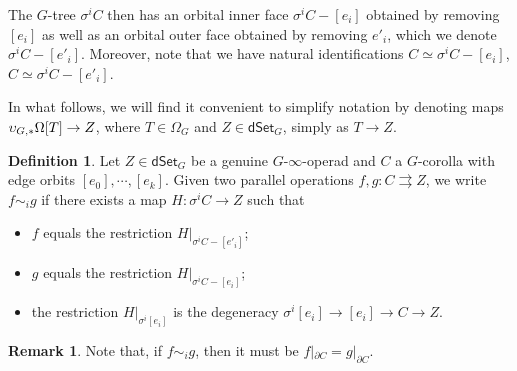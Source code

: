 \documentclass[a4paper,10pt
,draft
]{article}%
\numberwithin{equation}{section}
\numberwithin{figure}{section}
\theoremstyle{definition} %
\newtheorem{definition}[equation]{Definition}%
\newtheorem{remark}[equation]{Remark}%
\newcommand{\1}{\ensuremath{\mathbbm 1}}%
\begin{document}
The $G$-tree $\sigma^i C$ then has an orbital inner face
$\sigma^i C - [e_i]$ obtained by removing $[e_i]$
as well as an orbital outer face obtained by removing $e'_i$,
which we denote $\sigma^i C - [e'_i]$.
Moreover, note that we have natural identifications
$C \simeq \sigma^i C - [e_i]$,
$C \simeq \sigma^i C - [e'_i]$.



In what follows, we will find it convenient to simplify notation by denoting maps $\upsilon_{G,\**}\Omega[T] \to Z$,
where $T \in \Omega_G$ and $Z \in \mathsf{dSet}_G$,
simply as $T \to Z$.


\begin{definition}\label{HOEQUIVS DEF}
	Let $Z \in \mathsf{dSet}_G$ be a genuine $G$-$\infty$-operad and $C$ a $G$-corolla with edge orbits
	$[e_0],\cdots,[e_k]$.
%	
	Given two parallel operations 
	$f,g\colon C \rightrightarrows Z$,
	we write $f \sim_i g$ if there exists a map
	$H \colon \sigma^i C \to Z$ such that
\begin{itemize}
\item $f$ equals the restriction $H|_{\sigma^i C-[e'_i]}$;
\item $g$ equals the restriction $H|_{\sigma^i C-[e_i]}$;
\item the restriction $H|_{\sigma^i [e_i]}$
is the degeneracy $\sigma^i [e_i] \to [e_i] \to C \to Z$.
\end{itemize}
\end{definition}


\begin{remark}\label{HOMOTBOUND REM}
	Note that, if $f \sim_i g$, then it must be
	$f|_{\partial C} = g|_{\partial C}$.
\end{remark}
\end{document}
